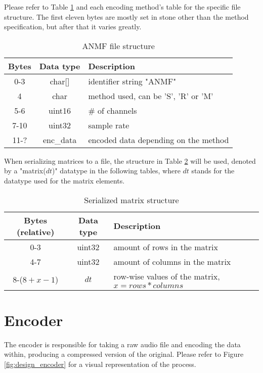 Please refer to Table \ref{tab:anmf_file} and each encoding method's table for the specific file structure. The first eleven bytes are mostly set in stone other than the method specification, but after that it varies greatly.

\begin{table}[htbp]\caption{ANMF file structure}
	\label{tab:anmf_file}
	\centering
	\begin{tabular}{|c|c|l|}
		\hline
		Bytes & Data type & Description \\ \hline
		0-3 & char[] & identifier string "ANMF" \\
		4 & char & method used, can be 'S', 'R' or 'M' \\
		5-6 & uint16 & \# of channels \\
		7-10 & uint32 & sample rate \\
		11-? & enc\_data & encoded data depending on the method \\
		\hline
	\end{tabular}
\end{table}

When serializing matrices to a file, the structure in Table \ref{tab:anmf_serial_matrix} will be used, denoted by a "matrix($dt$)" datatype in the following tables, where $dt$ stands for the datatype used for the matrix elements.

\begin{table}[htbp]\caption{Serialized matrix structure}
	\label{tab:anmf_serial_matrix}
	\centering
	\begin{tabular}{|c|c|l|}
		\hline
		Bytes (relative) & Data type & Description \\ \hline
		0-3 & uint32 & amount of rows in the matrix \\
		4-7 & uint32 & amount of columns in the matrix \\
		8-($8+x-1$) & $dt$ & row-wise values of the matrix, $x = rows*columns$ \\
		\hline
	\end{tabular}
\end{table}

\section{Encoder}
The encoder is responsible for taking a raw audio file and encoding the data within, producing a compressed version of the original. Please refer to Figure \ref{fig:design_encoder} for a visual representation of the process.

